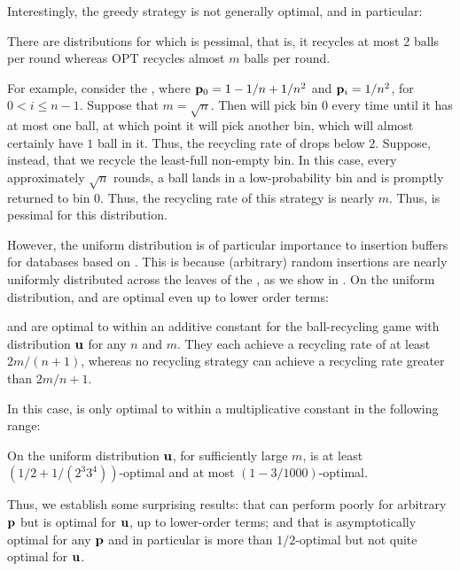 Interestingly, the greedy strategy \FB is not generally optimal, and in
particular:
\begin{observation}
There are distributions for which \FB is pessimal, that is, it
recycles at most 2 balls per round whereas OPT recycles almost $m$
balls per round.
\end{observation}
For example, consider the , where $\mathbf{p}_0 =
1-1/n+1/n^2$ and $\mathbf{p}_i = 1/n^2$, for $0<i\leq n-1$.  Suppose that $m=\sqrt{n}$.
Then \FB will pick bin $0$ every time until it has at most one ball, at which
point it will pick another bin, which will almost certainly have $1$ ball in
it.  Thus, the recycling rate of \FB drops below $2$.  Suppose, instead, that
we recycle the least-full non-empty bin.  In this case, every approximately
$\sqrt{n}$ rounds, a ball lands in a low-probability bin and is promptly
returned to bin $0$. Thus, the recycling rate of this strategy is nearly $m$.
Thus, \FB is pessimal for this distribution.

However, the uniform distribution is of particular importance to insertion
buffers for databases based on \btrees{}. This is because (arbitrary) random
\btree{} insertions are nearly uniformly distributed across the leaves of the
\btree{}, as we show in . On the uniform distribution, \FB
and \GG are optimal even up to lower order terms:

\begin{theorem}\label{thm:fullestbin}
  \FB and \GG are optimal to within an additive constant for the
  ball-recycling game with distribution $\mathbf{u}$ 
  for any $n$ and $m$.  They each achieve a
  recycling rate of at least $2m/(n+1)$, whereas no recycling strategy can
  achieve a recycling rate greater than $2m/n + 1$.
\end{theorem}

In this case, \RB is only optimal to within a multiplicative constant
in the following range:

\begin{theorem}\label{thm:rbuniform}
	On the uniform distribution $\mathbf{u}$, for sufficiently large
        $m$, \RB is at least $(1/2+1/(2^3
	3^4))$-optimal and at most $(1-3/1000)$-optimal.
\end{theorem}

Thus, we establish some surprising results: that \FB can perform poorly for
arbitrary $\mathbf{p}$ but is optimal for $\mathbf{u}$, up to lower-order terms; and that \RB
is asymptotically optimal for any $\mathbf{p}$ and in particular is more than
$1/2$-optimal but not quite optimal for $\mathbf{u}$.

